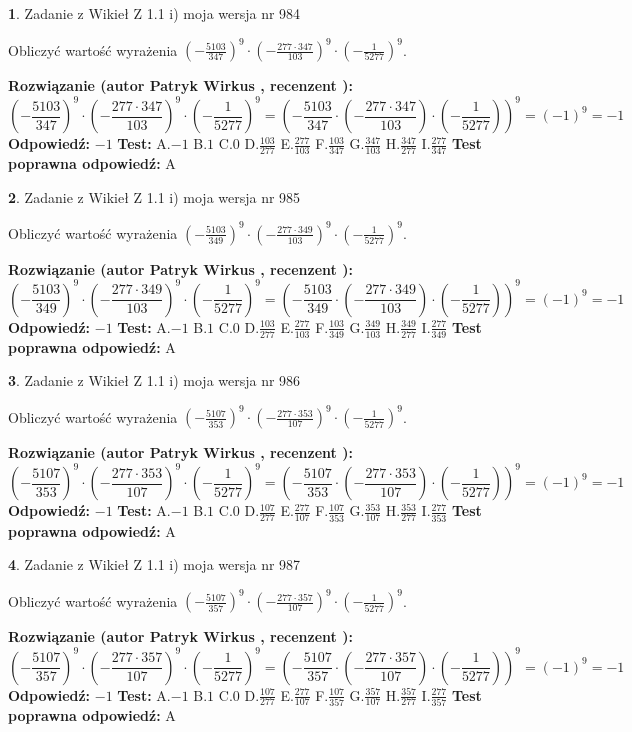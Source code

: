 \documentclass[12pt, a4paper]{article}
\theoremstyle{definition} %
\newtheorem{zad}{}
\newcommand{\zadStart}[1]{\begin{zad}#1\newline}
\newcommand{\zadStop}{\end{zad}}
\newcommand{\rozwStart}[2]{\noindent \textbf{Rozwiązanie (autor #1 , recenzent #2): }\newline}
\newcommand{\rozwStop}{\newline}
\newcommand{\odpStart}{\noindent \textbf{Odpowiedź:}\newline}
\newcommand{\odpStop}{\newline}
\newcommand{\testStart}{\noindent \textbf{Test:}\newline}
\newcommand{\testStop}{\newline}
\newcommand{\kluczStart}{\noindent \textbf{Test poprawna odpowiedź:}\newline}
\newcommand{\kluczStop}{\newline}
\begin{document}
\zadStart{Zadanie z Wikieł Z 1.1 i) moja wersja nr 984}

Obliczyć wartość wyrażenia $(-\frac{5103}{347})^{9} \cdot (-\frac{277 \cdot 347}{103})^{9} \cdot (-\frac{1}{5277})^{9}$.
\zadStop
\rozwStart{Patryk Wirkus}{}
$$(-\frac{5103}{347})^{9} \cdot (-\frac{277 \cdot 347}{103})^{9} \cdot (-\frac{1}{5277})^{9} = (-\frac{5103}{347} \cdot (-\frac{277 \cdot 347}{103}) \cdot (-\frac{1}{5277}))^{9} = (-1)^{9} = -1$$
\rozwStop
\odpStart
$-1$
\odpStop
\testStart
A.$-1$ B.$1$ C.$0$ D.$\frac{103}{277}$ E.$\frac{277}{103}$
F.$\frac{103}{347}$ G.$\frac{347}{103}$
H.$\frac{347}{277}$
I.$\frac{277}{347}$
\testStop
\kluczStart
A
\kluczStop



\zadStart{Zadanie z Wikieł Z 1.1 i) moja wersja nr 985}

Obliczyć wartość wyrażenia $(-\frac{5103}{349})^{9} \cdot (-\frac{277 \cdot 349}{103})^{9} \cdot (-\frac{1}{5277})^{9}$.
\zadStop
\rozwStart{Patryk Wirkus}{}
$$(-\frac{5103}{349})^{9} \cdot (-\frac{277 \cdot 349}{103})^{9} \cdot (-\frac{1}{5277})^{9} = (-\frac{5103}{349} \cdot (-\frac{277 \cdot 349}{103}) \cdot (-\frac{1}{5277}))^{9} = (-1)^{9} = -1$$
\rozwStop
\odpStart
$-1$
\odpStop
\testStart
A.$-1$ B.$1$ C.$0$ D.$\frac{103}{277}$ E.$\frac{277}{103}$
F.$\frac{103}{349}$ G.$\frac{349}{103}$
H.$\frac{349}{277}$
I.$\frac{277}{349}$
\testStop
\kluczStart
A
\kluczStop



\zadStart{Zadanie z Wikieł Z 1.1 i) moja wersja nr 986}

Obliczyć wartość wyrażenia $(-\frac{5107}{353})^{9} \cdot (-\frac{277 \cdot 353}{107})^{9} \cdot (-\frac{1}{5277})^{9}$.
\zadStop
\rozwStart{Patryk Wirkus}{}
$$(-\frac{5107}{353})^{9} \cdot (-\frac{277 \cdot 353}{107})^{9} \cdot (-\frac{1}{5277})^{9} = (-\frac{5107}{353} \cdot (-\frac{277 \cdot 353}{107}) \cdot (-\frac{1}{5277}))^{9} = (-1)^{9} = -1$$
\rozwStop
\odpStart
$-1$
\odpStop
\testStart
A.$-1$ B.$1$ C.$0$ D.$\frac{107}{277}$ E.$\frac{277}{107}$
F.$\frac{107}{353}$ G.$\frac{353}{107}$
H.$\frac{353}{277}$
I.$\frac{277}{353}$
\testStop
\kluczStart
A
\kluczStop



\zadStart{Zadanie z Wikieł Z 1.1 i) moja wersja nr 987}

Obliczyć wartość wyrażenia $(-\frac{5107}{357})^{9} \cdot (-\frac{277 \cdot 357}{107})^{9} \cdot (-\frac{1}{5277})^{9}$.
\zadStop
\rozwStart{Patryk Wirkus}{}
$$(-\frac{5107}{357})^{9} \cdot (-\frac{277 \cdot 357}{107})^{9} \cdot (-\frac{1}{5277})^{9} = (-\frac{5107}{357} \cdot (-\frac{277 \cdot 357}{107}) \cdot (-\frac{1}{5277}))^{9} = (-1)^{9} = -1$$
\rozwStop
\odpStart
$-1$
\odpStop
\testStart
A.$-1$ B.$1$ C.$0$ D.$\frac{107}{277}$ E.$\frac{277}{107}$
F.$\frac{107}{357}$ G.$\frac{357}{107}$
H.$\frac{357}{277}$
I.$\frac{277}{357}$
\testStop
\kluczStart
A
\kluczStop
\end{document}
